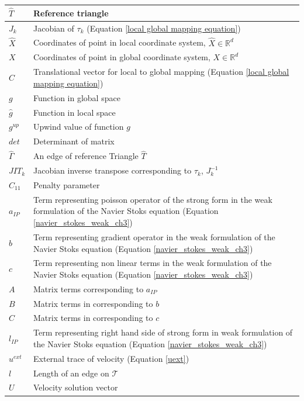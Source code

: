 \documentclass[a4paper,openany]{book}
\begin{document}
\begin{longtable}{| p{} | p{} |}
\hline
$\hat{T}$ & Reference triangle\\
\hline
$J_k$ & Jacobian of $\tau_k$ (Equation \eqref{local global mapping equation})\\
\hline
$\hat{X}$ & Coordinates of point in local coordinate system, $\hat{X} \in \mathbb{R}^d$\\
\hline
$X$ & Coordinates of point in global coordinate system, $X \in \mathbb{R}^d$\\
\hline
$C$ & Translational vector for local to global mapping (Equation \eqref{local global mapping equation})\\
\hline
$g$ & Function in global space \\
\hline
$\hat{g}$ & Function in local space \\
\hline
$g^{up}$ & Upwind value of function $g$\\
\hline
$det$ & Determinant of matrix \\
\hline
$\hat{\Gamma}$ & An edge of reference Triangle $\hat{T}$\\
\hline
$JIT_k$ & Jacobian inverse transpose corresponding to $\tau_k$, $J_k^{-1}$\\
\hline
$C_{11}$ & Penalty parameter \\
\hline
$a_{IP}$ & Term representing poisson operator of the strong form in the weak formulation of the Navier Stoks equation (Equation \eqref{navier_stokes_weak_ch3}) \\
\hline
$b$ & Term representing gradient operator in the weak formulation of the Navier Stoks equation (Equation \eqref{navier_stokes_weak_ch3})\\
\hline
$c$ & Term representing non linear terms in the weak formulation of the Navier Stoks equation (Equation \eqref{navier_stokes_weak_ch3})\\
\hline
$A$ & Matrix terms corresponding to $a_{IP}$\\
\hline
$B$ & Matrix terms in corresponding to $b$\\
\hline
$C$ & Matrix terms in corresponding to $c$\\
\hline
$l_{IP}$ & Term representing right hand side of strong form in weak formulation of the Navier Stoks equation (Equation \eqref{navier_stokes_weak_ch3}) \\
\hline
$u^{ext}$ & External trace of velocity (Equation \eqref{uext})\\
\hline
$l$ & Length of an edge on $\mathcal{T}$\\
\hline
$U$ & Velocity solution vector \\

\end{longtable}
\end{document}
